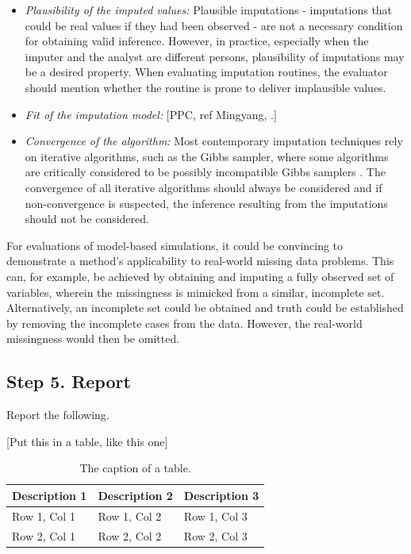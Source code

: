 \documentclass[bimj,fleqn]{w-art}
\theoremstyle{plain}
\theoremstyle{definition}
\begin{document}
\begin{itemize}
  \item \emph{Plausibility of the imputed values:} Plausible imputations - imputations that could be real values if they had been observed - are not a necessary condition for obtaining valid inference. However, in practice, especially when the imputer and the analyst are different persons, plausibility of imputations may be a desired property. When evaluating imputation routines, the evaluator should mention whether the routine is prone to deliver implausible values. 
  \item \emph{Fit of the imputation model:} [PPC, ref Mingyang, \citep{nguy17, zhao22}.]
  \item \emph{Convergence of the algorithm:} Most contemporary imputation techniques rely on iterative algorithms, such as the Gibbs sampler, where some algorithms are critically considered to be possibly incompatible Gibbs samplers \citep[PIGS,][]{li2012imputing}. The convergence of all iterative algorithms should always be considered and if non-convergence is suspected, the inference resulting from the imputations should not be considered.  
  \end{itemize}
For evaluations of model-based simulations, it could be convincing to demonstrate a method's applicability to real-world missing data problems. This can, for example, be achieved by obtaining and imputing a fully observed set of variables, wherein the missingness is mimicked from a similar, incomplete set. Alternatively, an incomplete set could be obtained and truth could be established by removing the incomplete cases from the data. However, the real-world missingness would then be omitted.


\subsection{Step 5. Report}

Report the following.

[Put this in a table, like this one]

\begin{table}[htb]
\begin{center}
\caption{The caption of a table.}
\begin{tabular}{lll}
\hline
Description 1 & Description 2 & Description 3\\
\hline
Row 1, Col 1 & Row 1, Col 2 & Row 1, Col 3\\
Row 2, Col 1 & Row 2, Col 2 & Row 2, Col 3\\
\hline
\end{tabular}
\end{center}
\end{table}
\end{document}
